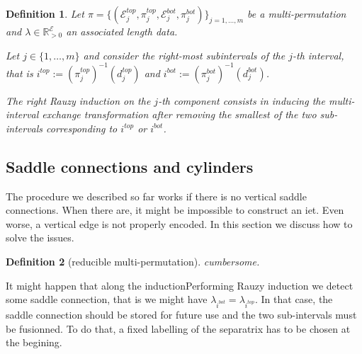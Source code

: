 \documentclass{article}
\def\RR{\mathbb{R}}
\def\cE{\mathcal{E}}
\newtheorem{definition}{Definition}
\newcommand{\commv}[1]{{\color{red!50!gray}{#1}}}
\begin{document}
\begin{definition}
Let
$\pi = \{(\cE^{top}_j, \pi^{top}_j, \cE^{bot}_j, \pi^{bot}_j)\}_{j=1,\ldots,m}$
be a multi-permutation and $\lambda \in \RR_{>0}^{\cE}$ an associated
length data.

Let $j \in \{1,\ldots,m\}$ and consider the right-most subintervals of
the $j$-th interval, that is $i^{top} := (\pi^{top}_j)^{-1}(d_j^{top})$
and $i^{bot} := (\pi^{bot}_j)^{-1}(d_j^{bot})$.

The \emph{right Rauzy induction on the $j$-th component} consists in inducing
the multi-interval exchange transformation after removing the smallest of
the two sub-intervals corresponding to $i^{top}$ or $i^{bot}$.
\end{definition}

\commv{TODO: implement the reduction algorithm that consists in reducing
a multi-iet to an iet via
\begin{enumerate}
\item if a gluing is available, do it
\item if there is none, perform Rauzy inductions until there is one
\end{enumerate}}

\subsection{Saddle connections and cylinders}
The procedure we described so far works if there is no vertical saddle connections.
When there are, it might be impossible to construct an iet. Even worse, a vertical
edge is not properly encoded. In this section we discuss how to solve the issues.

\begin{definition}[reducible multi-permutation]
cumbersome.
\end{definition}

It might happen that along the inductionPerforming Rauzy induction we detect some saddle connection,
that is we might have $\lambda_{i^{bot}} = \lambda_{i^{top}}$. In that case, the
saddle connection should be stored for future use and the two sub-intervals must be
fusionned. To do that, a fixed labelling of the separatrix has to be chosen at
the begining.
\end{document}

